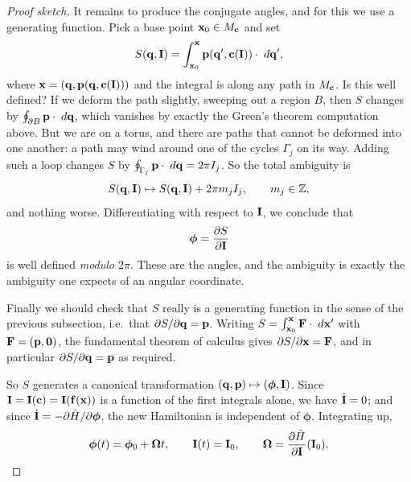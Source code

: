 \documentclass[a4paper]{scrartcl}
\begin{document}
\begin{proof}[Proof sketch]
	It remains to produce the conjugate angles, and for this we use a generating function. Pick a base point $\mathbf{x}_0 \in M_{\mathbf{c}}$ and set
	$$
	S(\mathbf{q}, \mathbf{I}) = \int_{\mathbf{x}_0}^{\mathbf{x}}\mathbf{p}(\mathbf{q}', \mathbf{c}(\mathbf{I}))\cdot\; d\mathbf{q}',
	$$
	where $\mathbf{x} = (\mathbf{q}, \mathbf{p}(\mathbf{q}, \mathbf{c}(\mathbf{I})))$ and the integral is along any path in $M_{\mathbf{c}}$. Is this well defined? If we deform the path slightly, sweeping out a region $B$, then $S$ changes by $\oint_{\partial B}\mathbf{p}\cdot\; d\mathbf{q}$, which vanishes by exactly the Green's theorem computation above. But we are on a torus, and there are paths that cannot be deformed into one another: a path may wind around one of the cycles $\Gamma_j$ on its way. Adding such a loop changes $S$ by $\oint_{\Gamma_j}\mathbf{p}\cdot\; d\mathbf{q} = 2\pi I_j$. So the total ambiguity is
	$$
	S(\mathbf{q}, \mathbf{I})\mapsto S(\mathbf{q}, \mathbf{I}) + 2\pi m_j I_j, \qquad m_j\in\mathbb{Z},
	$$
	and nothing worse. Differentiating with respect to $\mathbf{I}$, we conclude that
	$$
	\bm\phi = \frac{\partial S}{\partial \mathbf{I}}
	$$
	is well defined \emph{modulo $2\pi$}. These are the angles, and the ambiguity is exactly the ambiguity one expects of an angular coordinate.

	Finally we should check that $S$ really is a generating function in the sense of the previous subsection, i.e.\ that $\partial S/\partial \mathbf{q} = \mathbf{p}$. Writing $S = \int_{\mathbf{x}_0}^{\mathbf{x}}\mathbf{F}\cdot\; d\mathbf{x}'$ with $\mathbf{F} = (\mathbf{p}, \mathbf{0})$, the fundamental theorem of calculus gives $\partial S/\partial\mathbf{x} = \mathbf{F}$, and in particular $\partial S/\partial \mathbf{q} = \mathbf{p}$ as required.

	So $S$ generates a canonical transformation $(\mathbf{q}, \mathbf{p})\mapsto(\bm\phi, \mathbf{I})$. Since $\mathbf{I} = \mathbf{I}(\mathbf{c}) = \mathbf{I}(\mathbf{f}(\mathbf{x}))$ is a function of the first integrals alone, we have $\dot{\mathbf{I}} = 0$; and since $\dot{\mathbf{I}} = -\partial\tilde H/\partial\bm\phi$, the new Hamiltonian is independent of $\bm\phi$. Integrating up,
	$$
	\bm\phi(t) = \bm\phi_0 + \bm\Omega t, \qquad \mathbf{I}(t) = \mathbf{I}_0, \qquad \bm\Omega = \frac{\partial \tilde H}{\partial \mathbf{I}}(\mathbf{I}_0). \qedhere
	$$
\end{proof}
\end{document}
